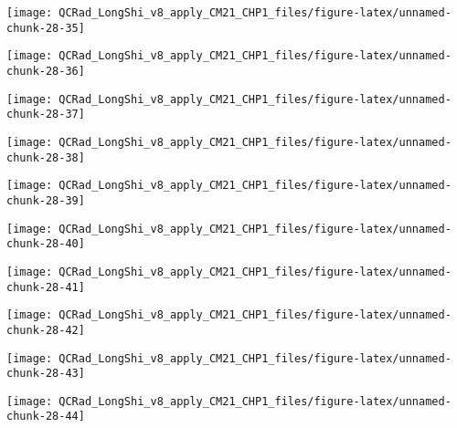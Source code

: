 \documentclass[
  10pt,
  a4paper,oneside]{article}
\begin{document}
\begin{center}\texttt{[image: QCRad\_LongShi\_v8\_apply\_CM21\_CHP1\_files/figure-latex/unnamed-chunk-28-35]} \end{center}

\begin{center}\texttt{[image: QCRad\_LongShi\_v8\_apply\_CM21\_CHP1\_files/figure-latex/unnamed-chunk-28-36]} \end{center}

\begin{center}\texttt{[image: QCRad\_LongShi\_v8\_apply\_CM21\_CHP1\_files/figure-latex/unnamed-chunk-28-37]} \end{center}

\begin{center}\texttt{[image: QCRad\_LongShi\_v8\_apply\_CM21\_CHP1\_files/figure-latex/unnamed-chunk-28-38]} \end{center}

\begin{center}\texttt{[image: QCRad\_LongShi\_v8\_apply\_CM21\_CHP1\_files/figure-latex/unnamed-chunk-28-39]} \end{center}

\begin{center}\texttt{[image: QCRad\_LongShi\_v8\_apply\_CM21\_CHP1\_files/figure-latex/unnamed-chunk-28-40]} \end{center}

\begin{center}\texttt{[image: QCRad\_LongShi\_v8\_apply\_CM21\_CHP1\_files/figure-latex/unnamed-chunk-28-41]} \end{center}

\begin{center}\texttt{[image: QCRad\_LongShi\_v8\_apply\_CM21\_CHP1\_files/figure-latex/unnamed-chunk-28-42]} \end{center}

\begin{center}\texttt{[image: QCRad\_LongShi\_v8\_apply\_CM21\_CHP1\_files/figure-latex/unnamed-chunk-28-43]} \end{center}

\begin{center}\texttt{[image: QCRad\_LongShi\_v8\_apply\_CM21\_CHP1\_files/figure-latex/unnamed-chunk-28-44]} \end{center}
\end{document}
